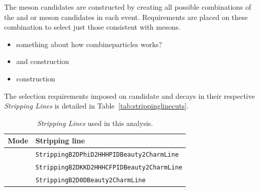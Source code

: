 
The \Bp meson candidates are constructed by creating all possible combinations of the \Dsp and \phiz or \Dzb meson candidates in each event.
Requirements are placed on these combination to select just those consistent with \Bp mesons.


{\color{Red}
\begin{itemize}
\item something about how combineparticles works?
\item \Dsp and \phiz construction 
\item \Bp construction
\end{itemize}
}


The selection requirements imposed on candidate \decay{\Bp}{\Dsp\phiz} and \decay{\Bp}{\Dsp\Kp\Km} decays in their respective \emph{Stripping Lines} is detailed in Table~\ref{tab:strippinglinecuts}. 


\begin{table}[h]
   \begin{center}
      \begin{tabular}{l l}
         \hline
         Mode & Stripping line \\ 
         \hline
         \decay{\Bp}{\Dsp\phiz}        & \texttt{StrippingB2DPhiD2HHHPIDBeauty2CharmLine}    \\
         \decay{\Bp}{\Dsp\Kp\Km}       & \texttt{StrippingB2DKKD2HHHCFPIDBeauty2CharmLine}   \\
         \decay{\Bp}{\Dsp\Dzb}         & \texttt{StrippingB2D0DBeauty2CharmLine}             \\
         \hline
      \end{tabular}
   \end{center}
   \caption{\emph{Stripping Lines} used in this analysis.}
   \label{tab:strippinglines}
\end{table}





